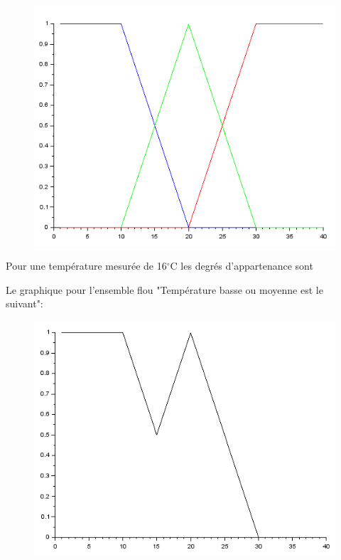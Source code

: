 \documentclass[a4paper,12pt]{report}
\begin{document}
\begin{figure}[!ht]
	\center	
	\includegraphics[scale=0.8]{image/e1-q1.PNG}
\end{figure} 

Pour une température mesurée de 16$^{\circ}$C les degrés d'appartenance sont


Le graphique pour l'ensemble flou "Température basse ou moyenne est le suivant":


\begin{figure}[!ht]
	\center	
	\includegraphics[scale=0.8]{image/e1-q2.PNG}
\end{figure} 
\end{document}
